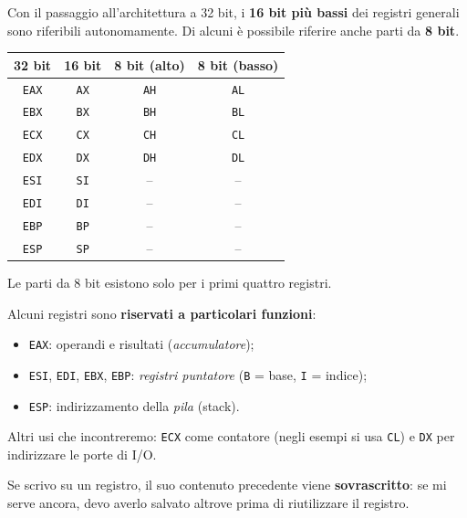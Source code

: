 \documentclass[11pt,a4paper]{article}
\begin{document}
Con il passaggio all'architettura a 32 bit, i \textbf{16 bit più bassi} dei registri generali sono riferibili autonomamente. Di alcuni è possibile riferire anche parti da \textbf{8 bit}.

\begin{integrazione}
\begin{center}
\begin{tabular}{c c c c}
\textbf{32 bit} & \textbf{16 bit} & \textbf{8 bit (alto)} & \textbf{8 bit (basso)} \\ \hline
\texttt{EAX} & \texttt{AX} & \texttt{AH} & \texttt{AL} \\
\texttt{EBX} & \texttt{BX} & \texttt{BH} & \texttt{BL} \\
\texttt{ECX} & \texttt{CX} & \texttt{CH} & \texttt{CL} \\
\texttt{EDX} & \texttt{DX} & \texttt{DH} & \texttt{DL} \\
\texttt{ESI} & \texttt{SI} & -- & -- \\
\texttt{EDI} & \texttt{DI} & -- & -- \\
\texttt{EBP} & \texttt{BP} & -- & -- \\
\texttt{ESP} & \texttt{SP} & -- & -- \\
\end{tabular}
\end{center}
Le parti da 8 bit esistono solo per i primi quattro registri.
\end{integrazione}

Alcuni registri sono \textbf{riservati a particolari funzioni}:
\begin{itemize}[leftmargin=*]
  \item \texttt{EAX}: operandi e risultati (\emph{accumulatore});
  \item \texttt{ESI}, \texttt{EDI}, \texttt{EBX}, \texttt{EBP}: \emph{registri puntatore} (\texttt{B} = base, \texttt{I} = indice);
  \item \texttt{ESP}: indirizzamento della \emph{pila} (stack).
\end{itemize}

\begin{integrazione}
Altri usi che incontreremo: \texttt{ECX} come contatore (negli esempi si usa \texttt{CL}) e \texttt{DX} per indirizzare le porte di I/O.
\end{integrazione}

\begin{nota}
Se scrivo su un registro, il suo contenuto precedente viene \textbf{sovrascritto}: se mi serve ancora, devo averlo salvato altrove prima di riutilizzare il registro.
\end{nota}
\end{document}
